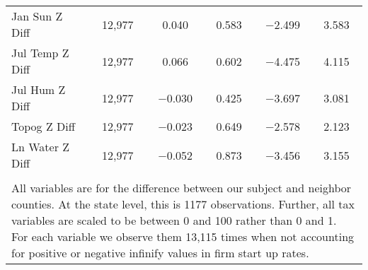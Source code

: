 \begin{table}[!htbp]
\begin{tabular}{@{\extracolsep{5pt}}lccccc}
Jan Sun Z Diff & 12,977 & 0.040 & 0.583 & $-$2.499 & 3.583 \\ 
Jul Temp Z Diff & 12,977 & 0.066 & 0.602 & $-$4.475 & 4.115 \\ 
Jul Hum Z Diff & 12,977 & $-$0.030 & 0.425 & $-$3.697 & 3.081 \\ 
Topog Z Diff & 12,977 & $-$0.023 & 0.649 & $-$2.578 & 2.123 \\ 
Ln Water Z Diff & 12,977 & $-$0.052 & 0.873 & $-$3.456 & 3.155 \\ 
\hline \\[-1.8ex] 
\multicolumn{6}{l}{All variables are for the difference between our subject and neighbor counties. At the state level, this is 1177 observations. Further, all tax variables are scaled to be between 0 and 100 rather than 0 and 1. For each variable we observe them 13,115 times when not accounting for positive or negative infinify values in firm start up rates.} \\ 
\end{tabular} 
\end{table} 
